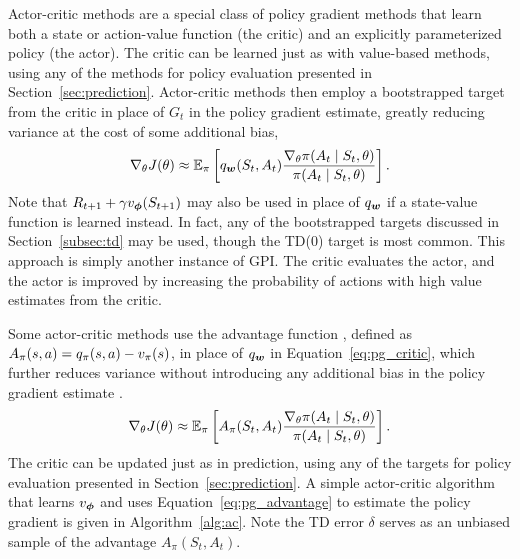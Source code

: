 Actor-critic methods are a special class of policy gradient methods that learn both a state or action-value function (the critic) and an explicitly parameterized policy (the actor). The critic can be learned just as with value-based methods, using any of the methods for policy evaluation presented in Section~\ref{sec:prediction}. Actor-critic methods then employ a bootstrapped target from the critic in place of $G_t$ in the policy gradient estimate, greatly reducing variance at the cost of some additional bias,
\begin{equation}
    \nabla_\theta J(\theta) \approx \operatorname{\mathbb{E}}_\pi \left[ q_{\bm w}(S_t, A_t) \frac{\nabla_\theta \pi(A_t \mid S_t, \theta)}{\pi(A_t \mid S_t, \theta)} \right].
    \label{eq:pg_critic}
\end{equation}
Note that $R_{t+1} + \gamma v_{\bm \phi}(S_{t+1})$ may also be used in place of $q_{\bm w}$ if a state-value function is learned instead. In fact, any of the bootstrapped targets discussed in Section~\ref{subsec:td} may be used, though the TD(0) target is most common. This approach is simply another instance of GPI. The critic evaluates the actor, and the actor is improved by increasing the probability of actions with high value estimates from the critic. 

Some actor-critic methods use the advantage function , defined as $A_\pi(s, a) = q_{\pi}(s, a) - v_{\pi}(s)$, in place of $q_{\bm w}$ in Equation~\eqref{eq:pg_critic}, which further reduces variance without introducing any additional bias in the policy gradient estimate \cite{sutton1998introduction}.
\begin{equation}
    \nabla_\theta J(\theta) \approx \operatorname{\mathbb{E}}_\pi \left[ A_\pi(S_t, A_t) \frac{\nabla_\theta \pi(A_t \mid S_t, \theta)}{\pi(A_t \mid S_t, \theta)} \right].
    \label{eq:pg_advantage}
\end{equation}
The critic can be updated just as in prediction, using any of the targets for policy evaluation presented in Section~\ref{sec:prediction}. A simple actor-critic algorithm that learns $v_{\bm \phi}$ and uses Equation~\eqref{eq:pg_advantage} to estimate the policy gradient is given in Algorithm~\ref{alg:ac}. Note the TD error $\delta$ serves as an unbiased sample of the advantage $A_\pi(S_t, A_t)$.

